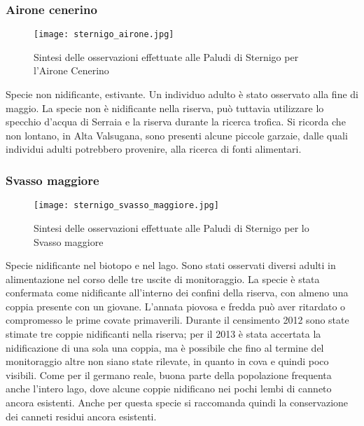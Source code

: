 \documentclass[11pt,a4paper,twoside]{memoir}
\begin{document}
\subsubsection{Airone cenerino}
\vspace*{\fill}
\begin{figure}[H]
  \centering
  \texttt{[image: sternigo\_airone.jpg]}
  \caption{Sintesi delle osservazioni effettuate alle Paludi di Sternigo per l'Airone Cenerino}
\end{figure}\vspace*{\fill}
Specie non nidificante, estivante. Un individuo adulto è stato osservato alla fine di maggio. La specie non è nidificante nella riserva, può tuttavia utilizzare lo specchio d'acqua di Serraia e la riserva durante la ricerca trofica. Si ricorda che non lontano, in Alta Valsugana, sono presenti alcune piccole garzaie, dalle quali individui adulti potrebbero provenire, alla ricerca di fonti alimentari.

\subsubsection{Svasso maggiore}
\vspace*{\fill}
\begin{figure}[H]
  \centering
  \texttt{[image: sternigo\_svasso\_maggiore.jpg]}
  \caption{Sintesi delle osservazioni effettuate alle Paludi di Sternigo per lo Svasso maggiore}
\end{figure}\vspace*{\fill}
Specie nidificante nel biotopo e nel lago. Sono stati osservati diversi adulti in alimentazione nel corso delle tre uscite di monitoraggio. La specie è stata confermata come nidificante all'interno dei confini della riserva, con almeno una coppia presente con un giovane. L'annata piovosa e fredda può aver ritardato o compromesso le prime covate primaverili. Durante il censimento 2012 sono state stimate tre coppie nidificanti nella riserva; per il 2013 è stata accertata la nidificazione di una sola una coppia, ma è possibile che fino al termine del monitoraggio altre non siano state rilevate, in quanto in cova e quindi poco visibili. Come per il germano reale, buona parte della popolazione frequenta anche l’intero lago, dove alcune coppie nidificano nei pochi lembi di canneto ancora esistenti. Anche per questa specie si raccomanda quindi la conservazione dei canneti residui ancora esistenti. 
\end{document}
